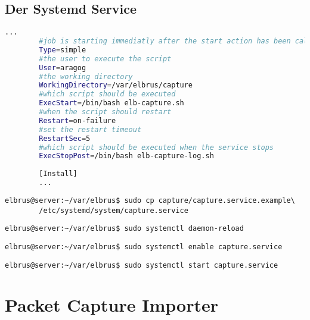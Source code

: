 \documentclass{article}
\begin{document}
	\subsection[systemd service]{Der Systemd Service}
	\begin{lstlisting}[caption={capture.service.example - Die Variable 'WorkingDirectory', Die Variable 'User' sowie die Variable 'ExecStopPost' anpassen.},language=bash ,keywords={WorkingDirectory, User, ExecStopPost}, keywordstyle=\color{red}, firstnumber=3]
		...
		#job is starting immediatly after the start action has been called
		Type=simple
		#the user to execute the script
		User=aragog
		#the working directory
		WorkingDirectory=/var/elbrus/capture
		#which script should be executed
		ExecStart=/bin/bash elb-capture.sh
		#when the script should restart
		Restart=on-failure
		#set the restart timeout
		RestartSec=5
		#which script should be executed when the service stops
		ExecStopPost=/bin/bash elb-capture-log.sh
		
		[Install]
		...
	\end{lstlisting}
	
	\lstset{style=commands}
	\begin{lstlisting}[caption={Kopieren des Serviceprogrammes.}]
		elbrus@server:~/var/elbrus$ sudo cp capture/capture.service.example\
		/etc/systemd/system/capture.service
	\end{lstlisting}

	\begin{lstlisting}[caption={Neuladen des 'systemctl' Deamons.}]
		elbrus@server:~/var/elbrus$ sudo systemctl daemon-reload
	\end{lstlisting}
	
	\begin{lstlisting}[caption={Aktivieren des Serviceprogrammes.}]
		elbrus@server:~/var/elbrus$ sudo systemctl enable capture.service
	\end{lstlisting}

	\begin{lstlisting}[caption={Starten des Serviceprogrammes.}]
		elbrus@server:~/var/elbrus$ sudo systemctl start capture.service
	\end{lstlisting}
	
	\newpage
	
	
	\section{Packet Capture Importer}
\end{document}
